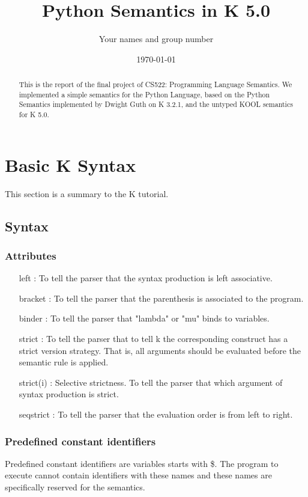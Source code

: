 \documentclass[a4paper]{article}
\title{Python Semantics in K 5.0}
\author{Your names and group number}
\date{\today}
\begin{document}
\maketitle

\begin{abstract}
This is the report of the final project of CS522: Programming Language Semantics. We implemented a simple semantics for the Python Language, based on the Python Semantics implemented by Dwight Guth on K 3.2.1, and the untyped KOOL semantics for K 5.0.
\end{abstract}

\section{Basic K Syntax}
This section is a summary to the K tutorial.
\subsection{Syntax}
\subsubsection{Attributes}
\begin{itemize}
    \item [left]: To tell the parser that the syntax production is left associative.
    \item [bracket]: To tell the parser that the parenthesis is associated to the program.
    \item [binder]: To tell the parser that "lambda" or "mu" binds to variables.
    \item [strict]: To tell the parser that to tell k the corresponding construct has a strict version strategy. That is, all arguments should be evaluated before the semantic rule is applied.
    \item [strict(i)]: Selective strictness. To tell the parser that which argument of syntax production is strict.
    \item [seqstrict]: To tell the parser that the evaluation order is from left to right.
\end{itemize}

\subsubsection{Predefined constant identifiers}
Predefined constant identifiers are variables starts with \$. The program to execute cannot contain identifiers with these names and these names are specifically reserved for the semantics.
\end{document}
